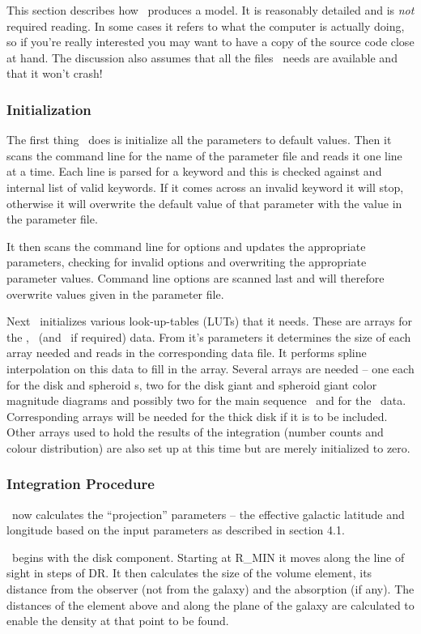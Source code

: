 This section describes how \egm\ produces a model. It is reasonably 
detailed and is {\em not} required reading. In some cases it refers to 
what the computer is actually doing, so if you're really interested
you may want to have a copy of the source code close at hand.
The discussion also assumes that all the files \egm\ needs are available
and that it won't crash!

\subsubsection*{Initialization}
The first thing \egm\ does is initialize all the parameters to default
values. Then it scans the command line for the name of the parameter file and
reads it one line at a time. Each line is parsed for a keyword and this
is checked against and internal list of valid keywords.
If it comes across an invalid keyword it will stop,
otherwise it will overwrite the default value of that parameter with the
value in the parameter file. 

It then scans the command line for options and updates the appropriate 
parameters, checking for invalid options and overwriting the appropriate
parameter values. Command line options are scanned last and will therefore
overwrite values given in the parameter file.

Next \egm\ initializes various look-up-tables (LUTs) that it needs. These are
arrays for the \lf, \cmd\ (and \fms\, if required) data. From 
it's parameters it determines the size of each array needed and reads in 
the corresponding data file. It performs
spline interpolation on this data to fill in the array. Several arrays are
needed -- one each for the disk and spheroid \lf s, two for the disk giant 
and spheroid giant color magnitude diagrams and possibly two for the main
sequence \cmd\ and for the \fms\ data. Corresponding arrays will be needed for 
the thick disk if it is to be included. Other arrays used to hold the results 
of the integration (number counts and colour distribution) are also set up at 
this time but are merely initialized to zero.

\subsubsection*{Integration Procedure}
\egm\ now calculates the ``projection'' parameters -- the effective
galactic latitude and longitude based on the input parameters as described
in section 4.1.

\egm\ begins with the disk component. Starting at R\_MIN it moves along the 
line of sight in steps of DR. It then calculates the size of the volume 
element, its distance from the observer (not from the galaxy) and the 
absorption (if any). The distances of the element above and along the plane
of the galaxy are calculated to enable the density at that point to be found.

